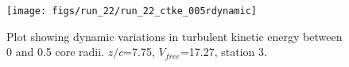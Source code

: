 \begin{figure}[H]
\centering
\texttt{[image: figs/run\_22/run\_22\_ctke\_005rdynamic]}
\caption{Plot showing dynamic variations in turbulent kinetic energy between 0 and 0.5 core radii. $z/c$=7.75, $V_{free}$=17.27, station 3.}
\label{fig:run_22_ctke_005rdynamic}
\end{figure}


